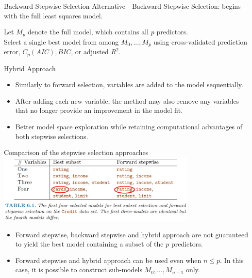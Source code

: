 \documentclass{beamer}
\begin{document}
	\begin{frame}{Backward Stepwise Selection}
		Alternative - Backward Stepwise Selection: begins with the full least squares model.
		\begin{algorithm}[H]
			\caption{Backward Stepwise Selection}
			Let $M_p$ denote the full model, which contains all $p$ predictors. \\
			Select a single best model from among $M_0, . . . , M_p$ using cross-validated prediction error, $C_p (AIC), BIC$, or adjusted $R^2$.
		\end{algorithm}
	\end{frame}
	
	\begin{frame}{Hybrid Approach}
		\begin{itemize}
			\item Similarly to forward selection, variables are added to the model sequentially.
			\item After adding each new variable, the method may also remove any variables that no longer provide an improvement in the model fit.
			\item Better model space exploration while retaining computational advantages of both stepwise selections.
		\end{itemize}
	\end{frame}

	\begin{frame}{Comparison of the stepwise selection approaches}
		\includegraphics[width=10cm]{table_6.1.png}
		\begin{itemize}
			\item Forward stepwise, backward stepwise and hybrid approach are not guaranteed to yield the best model containing a subset of the $p$ predictors.
			\item Forward stepwise and hybrid approach can be used even when $n \leq p$. In this case, it is possible to construct sub-models $M_0, ..., M_{n-1}$ only.
		\end{itemize}
	\end{frame}
	
\end{document}
